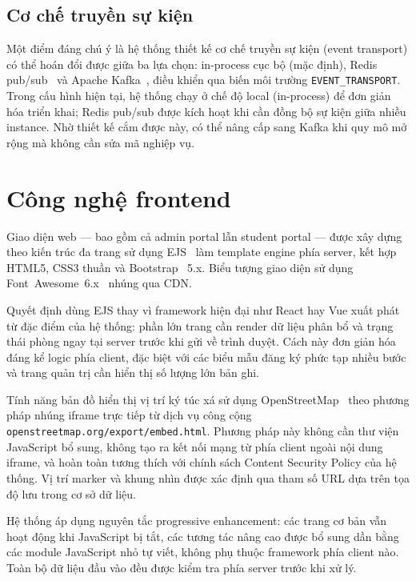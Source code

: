 \documentclass[../DoAn.tex]{subfiles}
\begin{document}
\subsection*{Cơ chế truyền sự kiện}

Một điểm đáng chú ý là hệ thống thiết kế cơ chế truyền sự kiện (event
transport) có thể hoán đổi được giữa ba lựa chọn: in-process cục bộ (mặc định),
Redis pub/sub~\cite{redis2024pubsub} và Apache Kafka~\cite{kafka_docs}, điều
khiển qua biến môi trường \texttt{EVENT\_TRANSPORT}. Trong cấu hình hiện tại,
hệ thống chạy ở chế độ local (in-process) để đơn giản hóa triển khai; Redis
pub/sub được kích hoạt khi cần đồng bộ sự kiện giữa nhiều instance. Nhờ thiết
kế cắm được này, có thể nâng cấp sang Kafka khi quy mô mở rộng mà không cần
sửa mã nghiệp vụ.

\section{Công nghệ frontend}
\label{sec:frontend}

Giao diện web --- bao gồm cả admin portal lẫn student portal --- được xây dựng
theo kiến trúc đa trang sử dụng EJS~\cite{ejs_docs} làm template engine phía
server, kết hợp HTML5, CSS3 thuần và Bootstrap~\cite{bootstrap_docs} 5.x.
Biểu tượng giao diện sử dụng Font~Awesome~6.x~\cite{fontawesome_docs} nhúng
qua CDN.

Quyết định dùng EJS thay vì framework hiện đại như React hay Vue xuất phát từ
đặc điểm của hệ thống: phần lớn trang cần render dữ liệu phân bổ và trạng thái
phòng ngay tại server trước khi gửi về trình duyệt. Cách này đơn giản hóa đáng
kể logic phía client, đặc biệt với các biểu mẫu đăng ký phức tạp nhiều bước và
trang quản trị cần hiển thị số lượng lớn bản ghi.

Tính năng bản đồ hiển thị vị trí ký túc xá sử dụng OpenStreetMap~\cite{openstreetmap_docs}
theo phương pháp nhúng iframe trực tiếp từ dịch vụ công cộng
\texttt{openstreetmap.org/export/embed.html}. Phương pháp này không cần thư viện
JavaScript bổ sung, không tạo ra kết nối mạng từ phía client ngoài nội dung
iframe, và hoàn toàn tương thích với chính sách Content Security Policy của hệ
thống. Vị trí marker và khung nhìn được xác định qua tham số URL dựa trên tọa
độ lưu trong cơ sở dữ liệu.

Hệ thống áp dụng nguyên tắc progressive enhancement: các trang cơ bản vẫn hoạt
động khi JavaScript bị tắt, các tương tác nâng cao được bổ sung dần bằng các
module JavaScript nhỏ tự viết, không phụ thuộc framework phía client nào. Toàn
bộ dữ liệu đầu vào đều được kiểm tra phía server trước khi xử lý.
\end{document}
